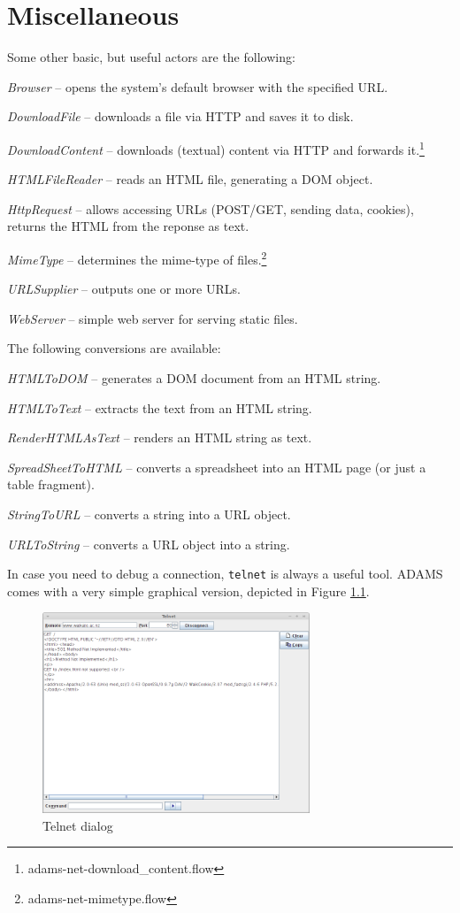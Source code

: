 \documentclass[a4paper]{book}
\begin{document}
\chapter{Miscellaneous}
Some other basic, but useful actors are the following:
\begin{tight_itemize}
	\item \textit{Browser} -- opens the system's default browser with the specified
	URL.
	\item \textit{DownloadFile} -- downloads a file via HTTP and saves it to disk.
	\item \textit{DownloadContent} -- downloads (textual) content via HTTP and 
	forwards it.\footnote{adams-net-download\_content.flow}
	\item \textit{HTMLFileReader} -- reads an HTML file, generating a DOM object.
	\item \textit{HttpRequest} -- allows accessing URLs (POST/GET, sending data,
	cookies), returns the HTML from the reponse as text.
	\item \textit{MimeType} -- determines the mime-type of
	files.\footnote{adams-net-mimetype.flow}
	\item \textit{URLSupplier} -- outputs one or more URLs.
	\item \textit{WebServer} -- simple web server for serving static files.
\end{tight_itemize}
The following conversions are available:
\begin{tight_itemize}
    \item \textit{HTMLToDOM} -- generates a DOM document from an HTML string.
    \item \textit{HTMLToText} -- extracts the text from an HTML string.
    \item \textit{RenderHTMLAsText} -- renders an HTML string as text.
	\item \textit{SpreadSheetToHTML} -- converts a spreadsheet into an HTML 
	page (or just a table fragment).
	\item \textit{StringToURL} -- converts a string into a URL object.
	\item \textit{URLToString} -- converts a URL object into a string.
\end{tight_itemize}
In case you need to debug a connection, \texttt{telnet} is always a useful tool.
ADAMS comes with a very simple graphical version, depicted in Figure \ref{telnet}.
\begin{figure}[htb]
  \centering
  \includegraphics[width=8.0cm]{images/telnet.png}
  \caption{Telnet dialog}
  \label{telnet}
\end{figure}



\end{document}

